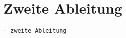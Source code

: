 %
%
%
\section{Zweite Ableitung
\label{buch:variation2:section:zweiteableitung}}

\begin{verbatim}
- zweite Ableitung
\end{verbatim}
